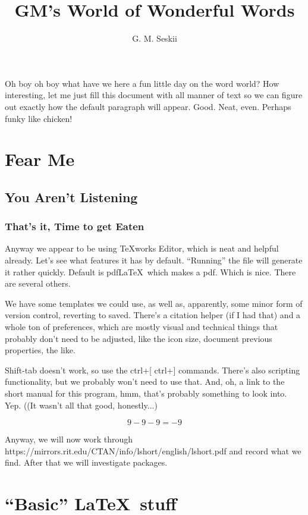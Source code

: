 \documentclass{article}
\title{GM's World of Wonderful Words}
\author{G. M. Seskii}
\date{}      %
\begin{document}
\pagestyle{fancy}
\fancyhead{}
\maketitle
\tableofcontents

Oh boy oh boy what have we here a fun little day on the word world? How interesting, let me just fill this document with all manner of text so we can figure out exactly how the default paragraph will appear. Good. Neat, even. Perhaps funky like chicken!

\section{Fear Me}
\subsection{You Aren't Listening}
\subsubsection{That's it, Time to get Eaten}

Anyway we appear to be using TeXworks Editor, which is neat and helpful already. Let's see what features it has by default. ``Running'' the file will generate it rather quickly. Default is pdf\LaTeX\ which makes a pdf. Which is nice. There are several others.

We have some templates we could use, as well as, apparently, some minor form of version control, reverting to saved. There's a citation helper (if I had that) and a whole ton of preferences, which are mostly visual and technical things that probably don't need to be adjusted, like the icon size, document previous properties, the like. 

Shift-tab doesn't work, so use the ctrl+[ ctrl+] commands. There's also scripting functionality, but we probably won't need to use that. And, oh, a link to the short manual for this program, hmm, that's probably something to look into. Yep. ((It wasn't all that good, honestly...)

\[9-9-9=-9\]

Anyway, we will now work through https://mirrors.rit.edu/\-CTAN\-/info\-/lshort\-/english\-/lshort.pdf and record what we find. After that we will investigate packages.

\section{``Basic'' \LaTeX\ stuff}
\end{document}
